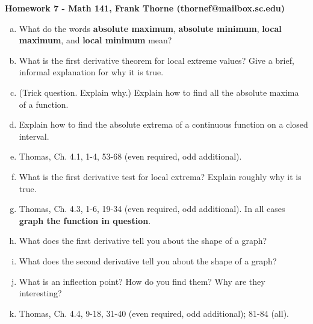 \documentclass[12pt]{article}
\begin{document}
\setlength{\topmargin}{-2mm}





\begin{center}{\bf Homework 7 - Math 141, Frank Thorne (thornef@mailbox.sc.edu)}
\end{center}

\begin{enumerate}[(a)]

\item
What do the words {\bf absolute maximum}, {\bf absolute minimum}, {\bf local maximum},
and {\bf local minimum} mean?

\item
What is the first derivative theorem for local extreme values? Give a brief,
informal explanation for why it is true.

\item
(Trick question. Explain why.) Explain how to find all the absolute maxima of a function.

\item
Explain how to find the absolute extrema of a continuous function on a closed interval.

\item
Thomas, Ch. 4.1, 1-4, 53-68 (even required, odd additional).

\item
What is the first derivative test for local extrema? Explain roughly why it is true.

\item
Thomas, Ch. 4.3, 1-6, 19-34 (even required, odd additional). In all cases {\bf
graph the function in question}.


\item
What does the first derivative tell you about the shape of a graph?

\item
What does the second derivative tell you about the shape of a graph?

\item
What is an inflection point? How do you find them? Why are they interesting?

\item
Thomas, Ch. 4.4, 9-18, 31-40 (even required, odd additional); 81-84 (all).

\end{enumerate}
\end{document}
